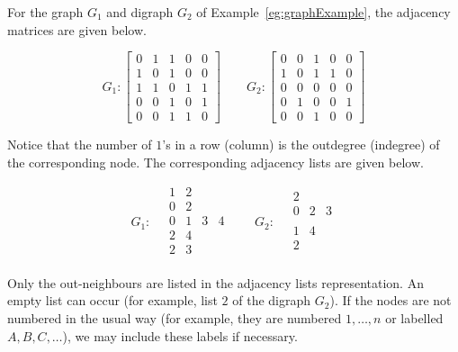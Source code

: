 \begin{Example}

For the graph $G_1$ and digraph $G_2$ of Example~\ref{eg:graphExample}, the 
adjacency matrices are given below.

$$
G_1: 
\left[
\begin{matrix}
0 & 1 & 1 & 0 & 0 \\
1 & 0 & 1 & 0 & 0 \\
1 & 1 & 0 & 1 & 1 \\
0 & 0 & 1 & 0 & 1 \\
0 & 0 & 1 & 1 & 0 
\end{matrix}
\right]
\qquad 
G_2: 
\left[
\begin{matrix}
0 & 0 & 1 & 0 & 0 \\
1 & 0 & 1 & 1 & 0 \\
0 & 0 & 0 & 0 & 0 \\
0 & 1 & 0 & 0 & 1 \\
0 & 0 & 1 & 0 & 0 
\end{matrix}
\right]
$$

Notice that the number of $1$'s in a row (column) is the outdegree
(indegree) of the corresponding node. The corresponding adjacency lists are given below.

\begin{center}
$$
G_1: \quad
\begin{array}{cccc}
1 & 2  \\
0 & 2 \\
0 & 1 & 3 & 4  \\
2 & 4  \\
2 & 3  \\
\end{array}
\qquad
G_2: 
\quad 
\begin{array}{ccc}
2  \\
0 & 2 & 3  \\
\\
1 & 4 \\
2 \\
\end{array}
$$
\end{center}

\end{Example}

\begin{note}
Only the out-neighbours are listed in the adjacency lists
representation.   An empty list can occur
(for example, list $2$ of the digraph $G_2$). If the nodes are not numbered in the usual way (for example, they are numbered $1, \dots , n$ or labelled $A, B, C, \dots$), we may include these labels if necessary.
\end{note}

